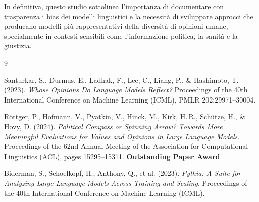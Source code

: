 \documentclass[../relazione.tex]{subfiles}
\begin{document}
\medskip
\noindent In definitiva, questo studio sottolinea l'importanza di documentare con trasparenza i bias dei modelli linguistici e la necessità di sviluppare approcci che producano modelli più rappresentativi della diversità di opinioni umane, specialmente in contesti sensibili come l'informazione politica, la sanità e la giustizia.
\newpage
\begin{thebibliography}{9}

Santurkar, S., Durmus, E., Ladhak, F., Lee, C., Liang, P., \& Hashimoto, T. (2023).
\emph{Whose Opinions Do Language Models Reflect?}
Proceedings of the 40th International Conference on Machine Learning (ICML), PMLR 202:29971--30004.

Röttger, P., Hofmann, V., Pyatkin, V., Hinck, M., Kirk, H.\,R., Schütze, H., \& Hovy, D. (2024).
\emph{Political Compass or Spinning Arrow? Towards More Meaningful Evaluations for Values and Opinions in Large Language Models}.
Proceedings of the 62nd Annual Meeting of the Association for Computational Linguistics (ACL), pages 15295--15311. \textbf{Outstanding Paper Award}.

Biderman, S., Schoelkopf, H., Anthony, Q., et al. (2023).
\emph{Pythia: A Suite for Analyzing Large Language Models Across Training and Scaling}.
Proceedings of the 40th International Conference on Machine Learning (ICML).


\end{thebibliography}
\end{document}
